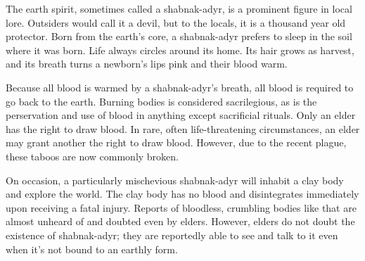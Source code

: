 \documentclass[blue]{Pestilence}
\begin{document}
\name{\bShabnakAdyr{}}

The earth spirit, sometimes called a shabnak-adyr, is a prominent figure in local lore. Outsiders would call it a devil, but to the locals, it is a thousand year old protector. Born from the earth's core, a shabnak-adyr prefers to sleep in the soil where it was born. Life always circles around its home. Its hair grows as harvest, and its breath turns a newborn's lips pink and their blood warm. 

Because all blood is warmed by a shabnak-adyr's breath, all blood is required to go back to the earth. Burning bodies is considered sacrilegious, as is the perservation and use of blood in anything except sacrificial rituals. Only an elder has the right to draw blood. In rare, often life-threatening circumstances, an elder may grant another the right to draw blood. However, due to the recent plague, these taboos are now commonly broken.

On occasion, a particularly mischevious shabnak-adyr will inhabit a clay body and explore the world. The clay body has no blood and disintegrates immediately upon receiving a fatal injury. Reports of bloodless, crumbling bodies like that are almost unheard of and doubted even by elders. However, elders do not doubt the existence of shabnak-adyr; they are reportedly able to see and talk to it even when it's not bound to an earthly form.   
\end{document}
